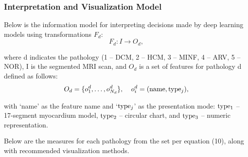 \documentclass[fleqn,10pt]{wlscirep}
\begin{document}
\subsubsection*{Interpretation and Visualization Model}

Below is the information model for interpreting decisions made by deep learning models using transformations \({F_d}\):
\begin{equation}
    {F_d}:I \to {O_d},
\end{equation}

where d indicates the pathology (1 – DCM, 2 – HCM, 3 – MINF, 4 – ARV, 5 – NOR), I is the segmented MRI scan, and \({O_d}\) is a set of features for pathology d defined as follows:
\begin{equation}
    {O_d} = \{ o_1^d, \ldots ,o_{{N_d}}^d\} ,\quad {\kern 1pt} o_i^d = ({\rm{name}},{\rm{typ}}{{\rm{e}}_j}),
\end{equation}

with ‘name’ as the feature name and ‘\({\rm{typ}}{{\rm{e}}_j}\)’ as the presentation mode: \({\rm{typ}}{{\rm{e}}_1}\) – 17-segment myocardium model, \({\rm{typ}}{{\rm{e}}_2}\) – circular chart, and \({\rm{typ}}{{\rm{e}}_3}\) – numeric representation.

Below are the measures for each pathology from the set per equation (10), along with recommended visualization methods.
\end{document}
